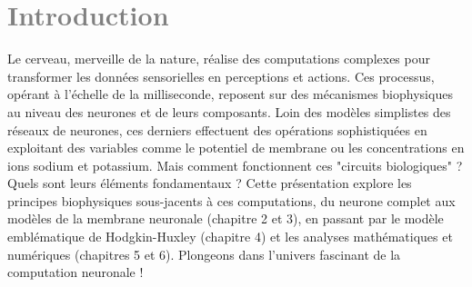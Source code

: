 \chapter*{\textcolor{gray}{Introduction}}
Le cerveau, merveille de la nature, réalise des computations complexes pour transformer les données sensorielles en perceptions et actions. Ces processus, opérant à l'échelle de la milliseconde, reposent sur des mécanismes biophysiques au niveau des neurones et de leurs composants. Loin des modèles simplistes des réseaux de neurones, ces derniers effectuent des opérations sophistiquées en exploitant des variables comme le potentiel de membrane ou les concentrations en ions sodium et potassium. Mais comment fonctionnent ces "circuits biologiques" ? Quels sont leurs éléments fondamentaux ? Cette présentation explore les principes biophysiques sous-jacents à ces computations, du neurone complet aux modèles de la membrane neuronale (chapitre 2 et 3), en passant par le modèle emblématique de Hodgkin-Huxley (chapitre 4) et les analyses mathématiques et numériques (chapitres 5 et 6). Plongeons dans l'univers fascinant de la computation neuronale !